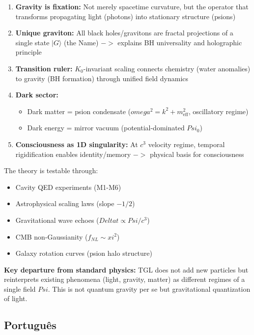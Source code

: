 \documentclass[12pt,a4paper]{article}
\def\Psi{Psi}%
\def\to{ -> }%
\def\xi{xi}%
\def\omega{omega}%
\def\Delta{Delta}%
\begin{document}
\begin{enumerate}
    \item \textbf{Gravity is fixation:} Not merely spacetime curvature, but the operator that transforms propagating light (photons) into stationary structure (psions)
    
    \item \textbf{Unique graviton:} All black holes/gravitons are fractal projections of a single state $|G\rangle$ (the Name) $\to$ explains BH universality and holographic principle
    
    \item \textbf{Transition ruler:} $K_0$-invariant scaling connects chemistry (water anomalies) to gravity (BH formation) through unified field dynamics
    
    \item \textbf{Dark sector:}
    \begin{itemize}
        \item Dark matter = psion condensate ($\omega^2 = k^2 + m_{\text{eff}}^2$, oscillatory regime)
        \item Dark energy = mirror vacuum (potential-dominated $\Psi_0$)
    \end{itemize}
    
    \item \textbf{Consciousness as 1D singularity:} At $c^3$ velocity regime, temporal rigidification enables identity/memory $\to$ physical basis for consciousness
\end{enumerate}

The theory is testable through:
\begin{itemize}
    \item Cavity QED experiments (M1-M6)
    \item Astrophysical scaling laws (slope $-1/2$)
    \item Gravitational wave echoes ($\Delta t \propto \Psi/c^3$)
    \item CMB non-Gaussianity ($f_{NL} \sim \xi^2$)
    \item Galaxy rotation curves (psion halo structure)
\end{itemize}

\textbf{Key departure from standard physics:} TGL does not add new particles but reinterprets existing phenomena (light, gravity, matter) as different regimes of a single field $\Psi$. This is not quantum gravity per se but gravitational quantization of light.

\subsection{Português}
\end{document}
